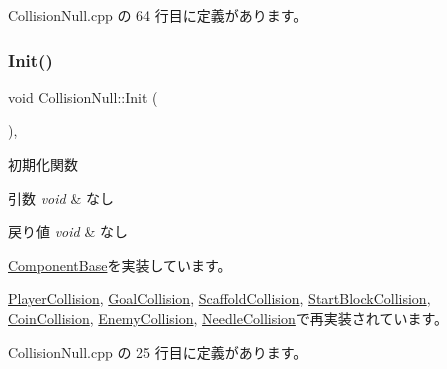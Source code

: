  Collision\+Null.\+cpp の 64 行目に定義があります。

\mbox{\label{class_collision_null_a18cfc21fefcd3e8dec380ac44a85f111}} 
\subsubsection{\texorpdfstring{Init()}{Init()}}
{\footnotesize\ttfamily void Collision\+Null\+::\+Init (\begin{DoxyParamCaption}{ }\end{DoxyParamCaption})\hspace{0.3cm}{\ttfamily [override]}, {\ttfamily [virtual]}}



初期化関数 


\begin{DoxyParams}{引数}
{\em void} & なし \\
\hline
\end{DoxyParams}

\begin{DoxyRetVals}{戻り値}
{\em void} & なし \\
\hline
\end{DoxyRetVals}


\mbox{\hyperlink{class_component_base_a125939d6befe42f28886a6523e86b18b}{Component\+Base}}を実装しています。



\mbox{\hyperlink{class_player_collision_a3dd6238b75933fd60aee77e92353cc44}{Player\+Collision}}, \mbox{\hyperlink{class_goal_collision_ab6089638f5390e019a55ae11952e1cf9}{Goal\+Collision}}, \mbox{\hyperlink{class_scaffold_collision_a604bdd1c99a88a81820f5c57d683015a}{Scaffold\+Collision}}, \mbox{\hyperlink{class_start_block_collision_a2ff4f4ba72b71c6083ce2b8ceb9c4e65}{Start\+Block\+Collision}}, \mbox{\hyperlink{class_coin_collision_a4119a7decab2410a4ada3568ad0c132d}{Coin\+Collision}}, \mbox{\hyperlink{class_enemy_collision_ae5c000a30c8c4a023dd0c8e658def772}{Enemy\+Collision}}, \mbox{\hyperlink{class_needle_collision_ae8084bdfa91ae1a7accfee33e31d429b}{Needle\+Collision}}で再実装されています。



 Collision\+Null.\+cpp の 25 行目に定義があります。

\mbox{\label{class_collision_null_a288a42487bf161a02ec716aea246e1a6}} 
